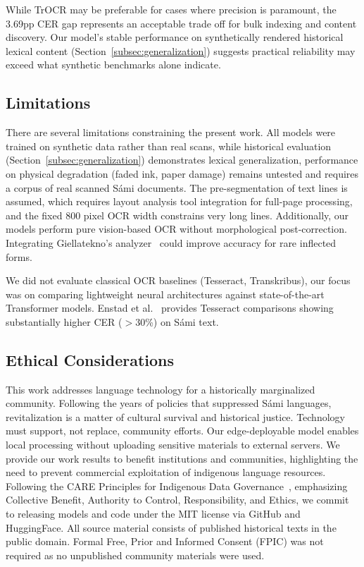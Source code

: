 \documentclass[conference]{IEEEtran}
\newcommand{\preprocessingImgWidth}{800}
\newcommand{\cerGap}{3.69}
\begin{document}
While TrOCR may be preferable for cases where precision is paramount, the \cerGap{}pp CER gap represents an acceptable trade off for bulk indexing and content discovery. Our model's stable performance on synthetically rendered historical lexical content (Section~\ref{subsec:generalization}) suggests practical reliability may exceed what synthetic benchmarks alone indicate.

\subsection{Limitations}
\label{subsec:limitations}

There are several limitations constraining the present work. All models were trained on synthetic data rather than real scans, while historical evaluation (Section~\ref{subsec:generalization}) demonstrates lexical generalization, performance on physical degradation (faded ink, paper damage) remains untested and requires a corpus of real scanned S\'{a}mi documents. The pre-segmentation of text lines is assumed, which requires layout analysis tool integration for full-page processing, and the fixed \preprocessingImgWidth{} pixel OCR width constrains very long lines. Additionally, our models perform pure vision-based OCR without morphological post-correction. Integrating Giellatekno's analyzer~\cite{moshagen2014} could improve accuracy for rare inflected forms.

We did not evaluate classical OCR baselines (Tesseract, Transkribus), our focus was on comparing lightweight neural architectures against state-of-the-art Transformer models. Enstad et al.~\cite{enstad2025} provides Tesseract comparisons showing substantially higher CER ($>$30\%) on S\'{a}mi text.

\subsection{Ethical Considerations}
\label{subsec:ethics}

This work addresses language technology for a historically marginalized community. Following the years of policies that suppressed S\'{a}mi languages, revitalization is a matter of cultural survival and historical justice. Technology must support, not replace, community efforts. Our edge-deployable model enables local processing without uploading sensitive materials to external servers. We provide our work results to benefit institutions and communities, highlighting the need to prevent commercial exploitation of indigenous language resources.
Following the CARE Principles for Indigenous Data Governance~\cite{carroll2020care}, emphasizing Collective Benefit, Authority to Control, Responsibility, and Ethics, we commit to releasing models and code under the MIT license via GitHub and HuggingFace. 
All source material consists of published historical texts in the public domain. Formal Free, Prior and Informed Consent (FPIC) was not required as no unpublished community materials were used. 
\end{document}
